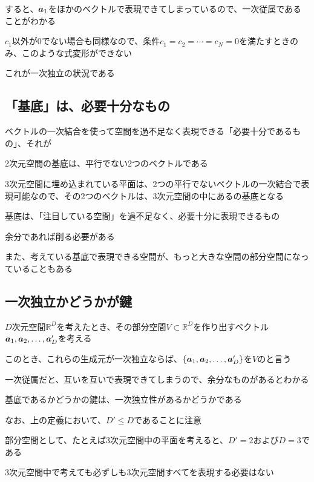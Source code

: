 \documentclass[../book_half_step_linear]{subfiles}
\begin{document}
すると、$\vb*{a}_1$をほかのベクトルで表現できてしまっているので、一次従属であることがわかる

\br

$c_1$以外が$0$でない場合も同様なので、条件$c_1 = c_2 = \cdots = c_N = 0$を満たすときのみ、このような式変形ができない

これが一次独立の状況である

\sectionline
\subsection{「基底」は、必要十分なもの}

ベクトルの一次結合を使って空間を過不足なく表現できる「必要十分であるもの」、それが

\br

2次元空間の基底は、平行でない2つのベクトルである

3次元空間に埋め込まれている平面は、2つの平行でないベクトルの一次結合で表現可能なので、その2つのベクトルは、3次元空間の中にあるの基底となる

\br

基底は、「注目している空間」を過不足なく、必要十分に表現できるもの

余分であれば削る必要がある

また、考えている基底で表現できる空間が、もっと大きな空間の部分空間になっていることもある

\sectionline
\subsection{一次独立かどうかが鍵}

$D$次元空間$\mathbb{R}^D$を考えたとき、その部分空間$V \subset \mathbb{R}^D$を作り出すベクトル$\vb*{a}_1, \vb*{a}_2, \ldots, \vb*{a}_D'$を考える

このとき、これらの生成元が一次独立ならば、$\{ \vb*{a}_1, \vb*{a}_2, \ldots, \vb*{a}_D' \}$を$V$のと言う

\br

一次従属だと、互いを互いで表現できてしまうので、余分なものがあるとわかる

基底であるかどうかの鍵は、一次独立性があるかどうかである

\br

なお、上の定義において、$D' \leq D$であることに注意

部分空間として、たとえば3次元空間中の平面を考えると、$D'=2$および$D=3$である

3次元空間中で考えても必ずしも3次元空間すべてを表現する必要はない
\end{document}
